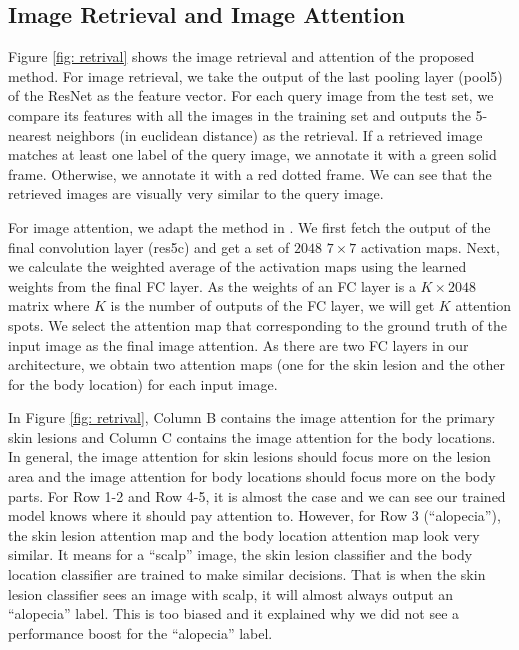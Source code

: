 \documentclass[letterpaper]{article}
\begin{document}
\subsection{Image Retrieval and Image Attention}

Figure \ref{fig: retrival} shows the image retrieval and attention of the
proposed method. For image retrieval, we take the output of the last pooling layer (pool5)
of the ResNet as the feature vector. For each query image from the test set, we compare its features with all the images in the training set and outputs the 5-nearest neighbors (in euclidean distance)
as the retrieval. If a retrieved image matches at least one label of
the query image, we annotate it with a green solid frame. Otherwise, we annotate
it with a red dotted frame. We can see that the retrieved images are visually very similar
to the query image.

For image attention, we adapt the method in \cite{DBLP:journals/corr/ZhouKLOT15}.
We first fetch the output of the final convolution layer (res5c) and get a set of $2048$ $7\times7$ activation maps.
Next, we calculate the weighted average of the activation maps using the learned weights
from the final FC layer. As the weights of an FC layer is a $K \times 2048$ matrix
where $K$ is the number of outputs of the FC layer, we will get $K$ attention spots.
We select the attention map that corresponding to the ground truth of the input
image as the final image attention. As there are two FC layers in our architecture,
we obtain two attention maps (one for the skin lesion and the other for the
body location) for each input image.

In Figure \ref{fig: retrival}, Column B contains the image attention for the
primary skin lesions and Column C contains the image attention for the body
locations. In general, the image attention for skin lesions should focus more
on the lesion area and the image attention for body locations should focus more
on the body parts. For Row 1-2 and Row 4-5, it is almost the case and we can see
our trained model knows where it should pay attention to. However, for Row 3 (``alopecia''),
the skin lesion attention map and the body location attention map look very similar. It
means for a ``scalp'' image, the skin lesion classifier and the body location
classifier are trained to make similar decisions. That is when the skin lesion classifier
sees an image with scalp, it will almost always output an ``alopecia'' label. This
is too biased and it explained why we did not see a performance boost for the ``alopecia''
label.
\end{document}
